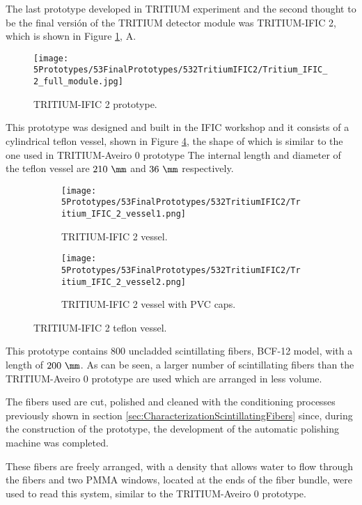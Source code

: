 The last prototype developed in TRITIUM experiment and the second thought to be the final versión of the TRITIUM detector module was TRITIUM-IFIC 2, which is shown in Figure \ref{fig:TritiumIFIC2}, A.

\begin{figure}[h]
\centering
\texttt{[image: 5Prototypes/53FinalPrototypes/532TritiumIFIC2/Tritium\_IFIC\_2\_full\_module.jpg]}
\caption{TRITIUM-IFIC 2 prototype.\label{fig:TritiumIFIC2}}
\end{figure}

This prototype was designed and built in the IFIC workshop and it consists of a cylindrical teflon vessel, shown in Figure \ref{fig:Tritium-IFIC2_vessels}, the shape of which is similar to the one used in TRITIUM-Aveiro 0 prototype The internal length and diameter of the teflon vessel are $210~\mm$ and $36~\mm$ respectively.

\begin{figure}
\centering
    \begin{subfigure}[b]{0.35\textwidth}
    \centering
    \texttt{[image: 5Prototypes/53FinalPrototypes/532TritiumIFIC2/Tritium\_IFIC\_2\_vessel1.png]}  
    \caption{TRITIUM-IFIC 2 vessel.\label{subfig:Tritium_IFIC_2_vessel}}
    \end{subfigure}
    \hfill
    \begin{subfigure}[b]{0.3\textwidth}
    \centering
    \texttt{[image: 5Prototypes/53FinalPrototypes/532TritiumIFIC2/Tritium\_IFIC\_2\_vessel2.png]}  
    \caption{TRITIUM-IFIC 2 vessel with PVC caps.\label{subfig:TritiumIFIC2_vessel_with_PVC_caps}}
    \end{subfigure}
 \caption{TRITIUM-IFIC 2 teflon vessel.}
 \label{fig:Tritium-IFIC2_vessels}
\end{figure}

This prototype contains $800$ uncladded scintillating fibers, BCF-12 model, with a length of $200~\mm$. As can be seen, a larger number of scintillating fibers than the TRITIUM-Aveiro 0 prototype are used which are arranged in less volume.

The fibers used are cut, polished and cleaned with the conditioning processes previously shown in section \ref{sec:CharacterizationScintillatingFibers} since, during the construction of the prototype, the development of the automatic polishing machine was completed.

These fibers are freely arranged, with a density that allows water to flow through the fibers and two PMMA windows, located at the ends of the fiber bundle, were used to read this system, similar to the TRITIUM-Aveiro 0 prototype. 

